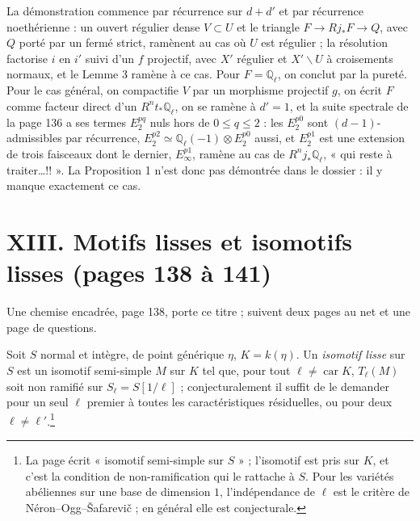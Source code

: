 \documentclass[11pt,a4paper]{article}
\begin{document}
La démonstration commence par récurrence sur $d + d'$ et par récurrence
noethérienne : un ouvert régulier dense $V \subset U$ et le triangle $F \to
Rj_{*}F \to Q$, avec $Q$ porté par un fermé strict, ramènent au cas où $U$ est
régulier ; la résolution factorise $i$ en $i'$ suivi d'un $f$ projectif, avec $X'$
régulier et $X' \smallsetminus U$ à croisements normaux, et le Lemme 3 ramène à ce
cas. Pour $F = \mathbb{Q}_{\ell}$, on conclut par la pureté. Pour le cas général, on
compactifie $V$ par un morphisme projectif $g$, on écrit $F$ comme facteur direct
d'un $R^{n}t_{*}\mathbb{Q}_{\ell}$, on se ramène à $d' = 1$, et la suite spectrale de
la page 136 a ses termes $E_{2}^{pq}$ nuls hors de $0 \leqslant q \leqslant 2$ : les
$E_{2}^{p0}$ sont $(d-1)$-admissibles par récurrence, $E_{2}^{p2} \simeq
\mathbb{Q}_{\ell}(-1) \otimes E_{2}^{p0}$ aussi, et $E_{2}^{p1}$ est une extension de
trois faisceaux dont le dernier, $E_{\infty}^{p1}$, ramène au cas de
$R^{n}j_{*}\mathbb{Q}_{\ell}$, « qui reste à traiter…!! ». La Proposition 1 n'est donc
pas démontrée dans le dossier : il y manque exactement ce cas.

\section*{XIII. Motifs lisses et isomotifs lisses (pages 138 à 141)}

Une chemise encadrée, page 138, porte ce titre ; suivent deux pages au net et une
page de questions.

Soit $S$ normal et intègre, de point générique $\eta$, $K = k(\eta)$. Un
\emph{isomotif lisse} sur $S$ est un isomotif semi-simple $M$ sur $K$ tel que, pour
tout $\ell \neq \operatorname{car} K$, $T_{\ell}(M)$ soit non ramifié sur $S_{\ell} =
S[1/\ell]$ ; conjecturalement il suffit de le demander pour un seul $\ell$ premier à
toutes les caractéristiques résiduelles, ou pour deux $\ell \neq
\ell'$.\footnote{La page écrit « isomotif semi-simple sur $S$ » ; l'isomotif est pris
sur $K$, et c'est la condition de non-ramification qui le rattache à $S$. Pour
les variétés abéliennes sur une base de dimension $1$, l'indépendance de $\ell$
est le critère de Néron--Ogg--Šafarevič ; en général elle est conjecturale.}
\end{document}
